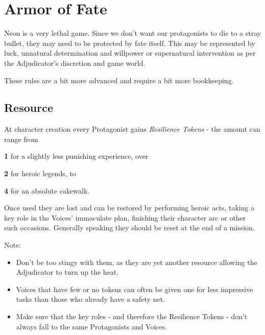 \chapter{Armor of Fate}
\label{ch:armoroffate}
Neon is a very lethal game.
Since we don't want our protagonists to die to a stray bullet, they may need to be protected by fate itself. 
This may be represented by luck, unnatural determination and willpower or supernatural intervention
	as per the Adjudicator's discretion and game world.
\begin{exampleblock}
	These rules are a bit more advanced and require a bit more bookkeeping.
\end{exampleblock}

\section{Resource}
At character creation every Protagonist gains \emph{Resilience Tokens} - the amount can range from
\begin{sitemize}
	\item \textbf{1} for a slightly less punishing experience, over
	\item \textbf{2} for heroic legends, to
	\item \textbf{4} for an absolute cakewalk.
\end{sitemize}
Once used they are lost and can be restored by performing heroic acts,
	taking a key role in the Voices' immaculate plan,
	finishing their character arc or other such occasions.
Generally speaking they should be reset at the end of a mission.
\begin{exampleblock}
	Note:
	\begin{itemize}
		\item Don't be too stingy with them, as they are yet another resource allowing the Adjudicator to turn up the heat.
		\item Voices that have few or no tokens can often be given one for less impressive tasks than those who already have a safety net.
		\item Make sure that the key roles - and therefore the Resilience Tokens - don't always fall to the same Protagonists and Voices.
	\end{itemize}
\end{exampleblock}
